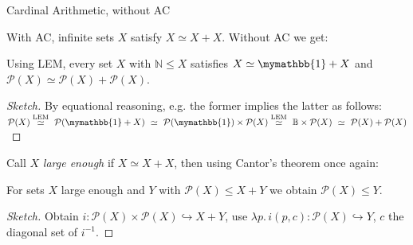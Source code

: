 \documentclass[xcolor=dvipsnames,compress,aspectratio=169,handout]{beamer}
\newcommand{\MBB}[1]{\ensuremath{\mathbb{#1}}\xspace}  %
\newcommand{\MCL}[1]{\ensuremath{\mathcal{#1}}\xspace} %
\newcommand{\Nat}{\MBB{N}}   %
\newcommand{\Bool}{\MBB{B}}  %
\newcommand{\Unit}{\mymathbb{1}}  %
\newcommand{\Pow}{\MCL P}
\begin{document}
\begin{frame}{Cardinal Arithmetic, without AC}

With AC, infinite sets $X$ satisfy $X\simeq X+X$.
\pause
Without AC we get:

\begin{lemma}
	Using LEM, every set $X$ with $\Nat\le X$ satisfies $X\simeq\Unit+X$ and $\Pow(X)\simeq\Pow(X)+\Pow(X)$.
\end{lemma}
\vspace{-0.1cm}
\pause
\begin{proof}[Sketch]
	By equational reasoning, e.g. the former implies the latter as follows:
	$\Pow(X)\overset{\textnormal{LEM}}\simeq~\Pow(\Unit+X)~\simeq~\Pow(\Unit)\times \Pow (X)\overset{\textnormal{LEM}}\simeq~\Bool\times \Pow(X)~\simeq~ \Pow(X)+\Pow(X)$
\end{proof}

\pause
\vspace{0.3cm}
Call $X$ \emph{large enough} if $X\simeq X+X$, then using Cantor's theorem once again:
\begin{lemma}
	For sets $X$ large enough and $Y$ with $\Pow (X)\le X+Y$ we obtain $\Pow (X)\le Y$.
\end{lemma}
\pause
\vspace{-0.1cm}
\begin{proof}[Sketch]
	Obtain $i:\Pow (X)\times\Pow (X)\hookrightarrow X+Y$, use $\lambda p.\, i(p,c):\Pow (X)\hookrightarrow Y$, $c$ the diagonal set of $i^{-1}$.
\end{proof}

\end{frame}
\end{document}
